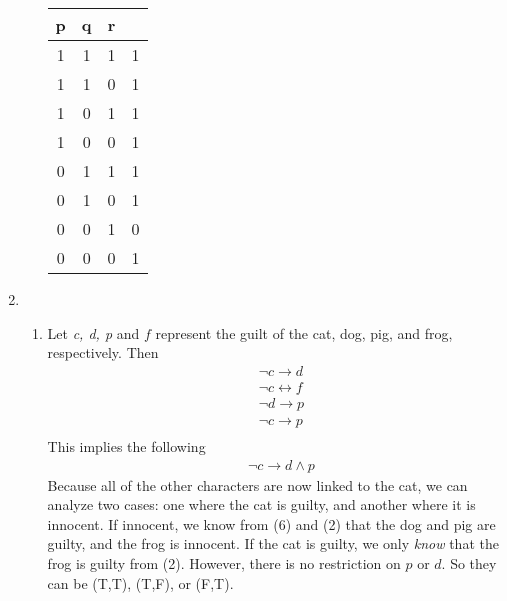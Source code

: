 \documentclass{article}
\begin{document}
\begin{enumerate}
\begin{enumerate}
		            \begin{tabular}{|c|c|c||c|}
			            \hline
			            p & q & r &   \\
			            \hline
			            1 & 1 & 1 & 1 \\
			            \hline
			            1 & 1 & 0 & 1 \\
			            \hline
			            1 & 0 & 1 & 1 \\
			            \hline
			            1 & 0 & 0 & 1 \\
			            \hline
			            0 & 1 & 1 & 1 \\
			            \hline
			            0 & 1 & 0 & 1 \\
			            \hline
			            0 & 0 & 1 & 0 \\
			            \hline
			            0 & 0 & 0 & 1 \\
			            \hline
		            \end{tabular}
	      \end{enumerate}
	\item \begin{enumerate}
		      \item Let \textit{c, d, p} and $f$ represent the guilt of the cat, dog,
		            pig, and frog, respectively. Then
		            \begin{align}
			             & \lnot c \to d             \\
			             & \lnot c \leftrightarrow f \\
			             & \lnot d \to p             \\
			             & \lnot c \to p             \\
		            \end{align}
		            This implies the following
		            \begin{align}
			             & \lnot c \to d \land p
		            \end{align}
		            Because all of the other characters are now linked to the
		            cat, we can analyze two cases: one where the cat is
		            guilty, and another where it is innocent. If innocent,
		            we know from (6) and (2) that the dog and pig are
		            guilty, and the frog is innocent. If the cat is
		            guilty, we only \textit{know} that the frog is guilty from (2).
		            However, there is no restriction on $p$ or $d$. So
		            they can be (T,T), (T,F), or (F,T).


\end{enumerate}
\end{enumerate}
\end{document}
